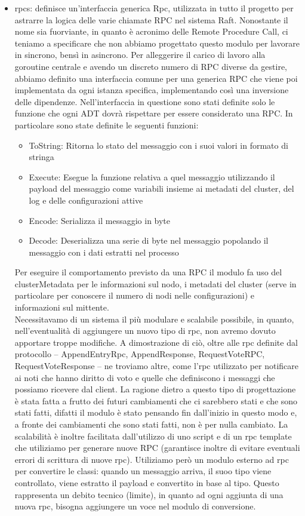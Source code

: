 \begin{itemize}
  \item rpcs: definisce un'interfaccia generica Rpc, utilizzata in tutto il progetto per astrarre la logica delle varie chiamate RPC nel sistema Raft. Nonostante il nome sia fuorviante, in quanto è acronimo delle Remote Procedure
    Call, ci teniamo a specificare che non abbiamo progettato questo modulo per lavorare in sincrono, bensì in asincrono.
    Per alleggerire il carico di lavoro alla goroutine centrale e avendo un discreto numero di RPC diverse da gestire, abbiamo definito una interfaccia comune per una generica RPC che viene poi implementata da ogni 
    istanza specifica, 
    implementando così una inversione delle dipendenze. Nell'interfaccia in questione sono stati definite solo le funzione che ogni ADT dovrà rispettare per essere considerato una RPC. In particolare sono state 
    definite le seguenti funzioni:
    \begin{itemize}
      \item ToString: Ritorna lo stato del messaggio con i suoi valori in formato di stringa
      \item Execute: Esegue la funzione relativa a quel messaggio utilizzando il payload del messaggio
          come variabili insieme ai metadati del cluster, del log e delle configurazioni attive
      \item Encode: Serializza il messaggio in byte
      \item Decode: Deserializza una serie di byte nel messaggio popolando il messaggio con i dati
        estratti nel processo
    \end{itemize}
    Per eseguire il comportamento previsto da una RPC il modulo fa uso del clusterMetadata 
    per le informazioni sul nodo, i metadati del cluster (serve in particolare per conoscere il numero di nodi nelle configurazioni) e informazioni sul mittente. \\
    Necessitavamo di un sistema il più modulare e scalabile possibile, in quanto,
    nell'eventualità di aggiungere un nuovo tipo di rpc, non avremo dovuto apportare troppe modifiche. A dimostrazione di ciò, oltre alle rpc definite dal protocollo -- AppendEntryRpc, AppendResponse, RequestVoteRPC, 
    RequestVoteResponse -- ne troviamo altre, come l'rpc utilizzato per notificare ai noti che hanno diritto di voto e quelle che definiscono i messaggi che possiamo ricevere dal client. La ragione dietro a questo tipo di 
    progettazione è stata 
    fatta a frutto dei futuri cambiamenti che ci sarebbero stati e che sono stati fatti, difatti il modulo è stato pensando fin dall'inizio in questo modo e, a fronte dei cambiamenti che sono stati fatti, non è per nulla cambiato. 
    La scalabilità è inoltre facilitata dall'utilizzo di uno script e di un rpc template che utiliziamo per generare nuove RPC (garantisce inoltre di evitare eventuali errori di scrittura di nuove rpc). 
    Utiliziamo però un modulo esterno ad rpc per convertire le classi: quando un messaggio arriva, il suoo tipo viene controllato, viene estratto il payload e convertito in base al tipo. Questo rappresenta un 
    debito tecnico (limite), in quanto ad ogni aggiunta di una nuova rpc, bisogna aggiungere un voce nel modulo di conversione. 
    

\end{itemize}
